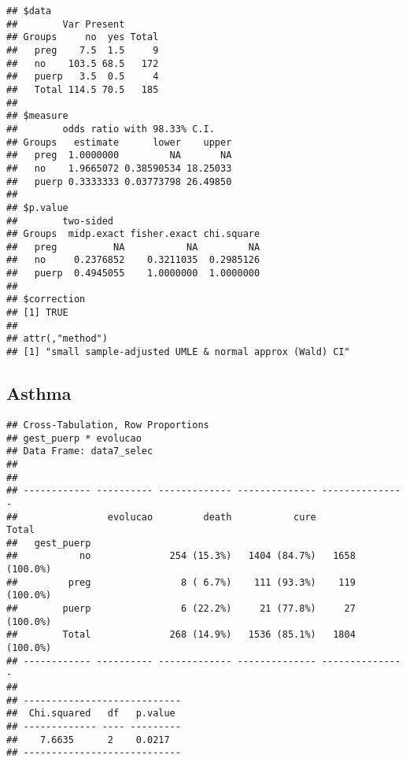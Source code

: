 \documentclass[
]{article}
\newenvironment{Shaded}{\begin{snugshade}}{\end{snugshade}}
\newcommand{\DataTypeTok}[1]{\textcolor[rgb]{0.13,0.29,0.53}{#1}}
\newcommand{\KeywordTok}[1]{\textcolor[rgb]{0.13,0.29,0.53}{\textbf{#1}}}
\newcommand{\NormalTok}[1]{#1}
\newcommand{\OperatorTok}[1]{\textcolor[rgb]{0.81,0.36,0.00}{\textbf{#1}}}
\newcommand{\OtherTok}[1]{\textcolor[rgb]{0.56,0.35,0.01}{#1}}
\newcommand{\StringTok}[1]{\textcolor[rgb]{0.31,0.60,0.02}{#1}}
\begin{document}
\begin{verbatim}
## $data
##        Var Present
## Groups     no  yes Total
##   preg    7.5  1.5     9
##   no    103.5 68.5   172
##   puerp   3.5  0.5     4
##   Total 114.5 70.5   185
## 
## $measure
##        odds ratio with 98.33% C.I.
## Groups   estimate      lower    upper
##   preg  1.0000000         NA       NA
##   no    1.9665072 0.38590534 18.25033
##   puerp 0.3333333 0.03773798 26.49850
## 
## $p.value
##        two-sided
## Groups  midp.exact fisher.exact chi.square
##   preg          NA           NA         NA
##   no     0.2376852    0.3211035  0.2985126
##   puerp  0.4945055    1.0000000  1.0000000
## 
## $correction
## [1] TRUE
## 
## attr(,"method")
## [1] "small sample-adjusted UMLE & normal approx (Wald) CI"
\end{verbatim}

\hypertarget{asthma}{%
\subsection{Asthma}\label{asthma}}

\begin{Shaded}
\end{Shaded}

\begin{Shaded}
\end{Shaded}

\begin{verbatim}
## Cross-Tabulation, Row Proportions  
## gest_puerp * evolucao  
## Data Frame: data7_selec  
## 
## 
## ------------ ---------- ------------- -------------- ---------------
##                evolucao         death           cure           Total
##   gest_puerp                                                        
##           no              254 (15.3%)   1404 (84.7%)   1658 (100.0%)
##         preg                8 ( 6.7%)    111 (93.3%)    119 (100.0%)
##        puerp                6 (22.2%)     21 (77.8%)     27 (100.0%)
##        Total              268 (14.9%)   1536 (85.1%)   1804 (100.0%)
## ------------ ---------- ------------- -------------- ---------------
## 
## ----------------------------
##  Chi.squared   df   p.value 
## ------------- ---- ---------
##    7.6635      2    0.0217  
## ----------------------------
\end{verbatim}
\end{document}
